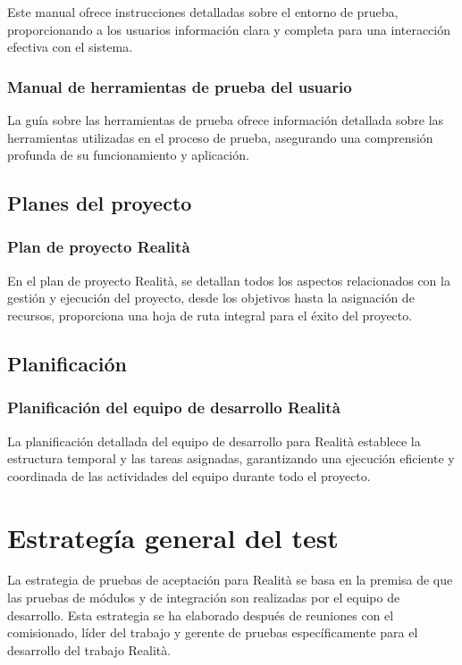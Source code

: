 \documentclass[12pt,a4paper, twoside]{article} %
\begin{document}
Este manual ofrece instrucciones detalladas sobre el entorno de prueba, proporcionando a los usuarios información clara y completa para una interacción efectiva con el sistema.

\subsubsection{Manual de herramientas de prueba del usuario}

La guía sobre las herramientas de prueba ofrece información detallada sobre las herramientas utilizadas en el proceso de prueba, asegurando una comprensión profunda de su funcionamiento y aplicación.

\subsection{Planes del proyecto}
\subsubsection{Plan de proyecto Realità}

En el plan de proyecto Realità, se detallan todos los aspectos relacionados con la gestión y ejecución del proyecto, desde los objetivos hasta la asignación de recursos, proporciona una hoja de ruta integral para el éxito del proyecto.

\subsection{Planificación}
\subsubsection{Planificación del equipo de desarrollo Realità}

La planificación detallada del equipo de desarrollo para Realità establece la estructura temporal y las tareas asignadas, garantizando una ejecución eficiente y coordinada de las actividades del equipo durante todo el proyecto.


\section{Estrategía general del test}
\label{sec:orgc1c4017}

La estrategia de pruebas de aceptación para Realità se basa en la premisa de que las pruebas de módulos y de integración son realizadas por el equipo de desarrollo. Esta estrategia se ha elaborado después de reuniones con el comisionado, líder del trabajo y gerente de pruebas específicamente para el desarrollo del trabajo Realità.
\end{document}
